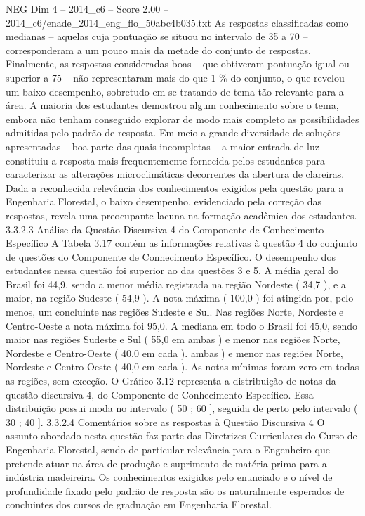 \begin{textsample}{NEG Dim 4 – 2014\_c6 – Score 2.00 – 2014\_c6/enade\_2014\_eng\_flo\_50abc4b035.txt}
As respostas classificadas como medianas – aquelas cuja pontuação se situou no intervalo de 35 a 70 – corresponderam a um pouco mais da metade do conjunto de respostas.
Finalmente, as respostas consideradas boas – que obtiveram pontuação igual ou superior a 75 – não representaram mais do que 1 \% do conjunto, o que revelou um baixo desempenho, sobretudo em se tratando de tema tão relevante para a área.
A maioria dos estudantes demostrou algum conhecimento sobre o tema, embora não tenham conseguido explorar de modo mais completo as possibilidades admitidas pelo padrão de resposta.
Em meio a grande diversidade de soluções apresentadas – boa parte das quais incompletas – a maior entrada de luz – constituiu a resposta mais frequentemente fornecida pelos estudantes para caracterizar as alterações microclimáticas decorrentes da abertura de clareiras.
Dada a reconhecida relevância dos conhecimentos exigidos pela questão para a Engenharia Florestal, o baixo desempenho, evidenciado pela correção das respostas, revela uma preocupante lacuna na formação acadêmica dos estudantes. 3.3.2.3 Análise da Questão Discursiva 4 do Componente de Conhecimento Específico A Tabela 3.17 contém as informações relativas à questão 4 do conjunto de questões do Componente de Conhecimento Específico.
O desempenho dos estudantes nessa questão foi superior ao das questões 3 e 5.
A média geral do Brasil foi 44,9, sendo a menor média registrada na região Nordeste ( 34,7 ), e a maior, na região Sudeste ( 54,9 ).
A nota máxima ( 100,0 ) foi atingida por, pelo menos, um concluinte nas regiões Sudeste e Sul.
Nas regiões Norte, Nordeste e Centro-Oeste a nota máxima foi 95,0.
A mediana em todo o Brasil foi 45,0, sendo maior nas regiões Sudeste e Sul ( 55,0 em ambas ) e menor nas regiões Norte, Nordeste e Centro-Oeste ( 40,0 em cada ). ambas ) e menor nas regiões Norte, Nordeste e Centro-Oeste ( 40,0 em cada ).
As notas mínimas foram zero em todas as regiões, sem exceção.
O Gráfico 3.12 representa a distribuição de notas da questão discursiva 4, do Componente de Conhecimento Específico.
Essa distribuição possui moda no intervalo ( 50 ; 60 ], seguida de perto pelo intervalo ( 30 ; 40 ]. 3.3.2.4 Comentários sobre as respostas à Questão Discursiva 4 O assunto abordado nesta questão faz parte das Diretrizes Curriculares do Curso de Engenharia Florestal, sendo de particular relevância para o Engenheiro que pretende atuar na área de produção e suprimento de matéria-prima para a indústria madeireira.
Os conhecimentos exigidos pelo enunciado e o nível de profundidade fixado pelo padrão de resposta são os naturalmente esperados de concluintes dos cursos de graduação em Engenharia Florestal.

\end{textsample}
